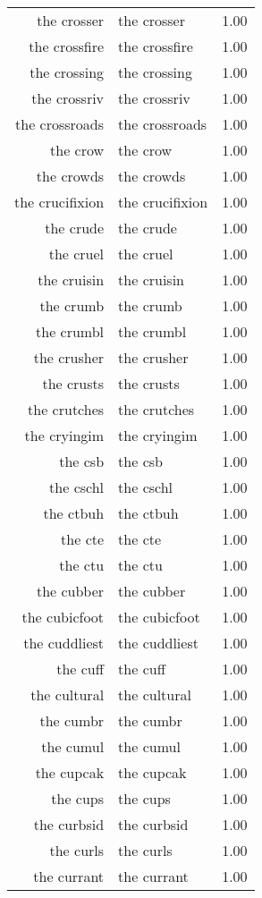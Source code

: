\begin{table}[ht]
\begin{tabular}{rlr}
  the crosser & the crosser & 1.00 \\ 
  the crossfire & the crossfire & 1.00 \\ 
  the crossing & the crossing & 1.00 \\ 
  the crossriv & the crossriv & 1.00 \\ 
  the crossroads & the crossroads & 1.00 \\ 
  the crow & the crow & 1.00 \\ 
  the crowds & the crowds & 1.00 \\ 
  the crucifixion & the crucifixion & 1.00 \\ 
  the crude & the crude & 1.00 \\ 
  the cruel & the cruel & 1.00 \\ 
  the cruisin & the cruisin & 1.00 \\ 
  the crumb & the crumb & 1.00 \\ 
  the crumbl & the crumbl & 1.00 \\ 
  the crusher & the crusher & 1.00 \\ 
  the crusts & the crusts & 1.00 \\ 
  the crutches & the crutches & 1.00 \\ 
  the cryingim & the cryingim & 1.00 \\ 
  the csb & the csb & 1.00 \\ 
  the cschl & the cschl & 1.00 \\ 
  the ctbuh & the ctbuh & 1.00 \\ 
  the cte & the cte & 1.00 \\ 
  the ctu & the ctu & 1.00 \\ 
  the cubber & the cubber & 1.00 \\ 
  the cubicfoot & the cubicfoot & 1.00 \\ 
  the cuddliest & the cuddliest & 1.00 \\ 
  the cuff & the cuff & 1.00 \\ 
  the cultural & the cultural & 1.00 \\ 
  the cumbr & the cumbr & 1.00 \\ 
  the cumul & the cumul & 1.00 \\ 
  the cupcak & the cupcak & 1.00 \\ 
  the cups & the cups & 1.00 \\ 
  the curbsid & the curbsid & 1.00 \\ 
  the curls & the curls & 1.00 \\ 
  the currant & the currant & 1.00 \\ 

\end{tabular}
\end{table}

